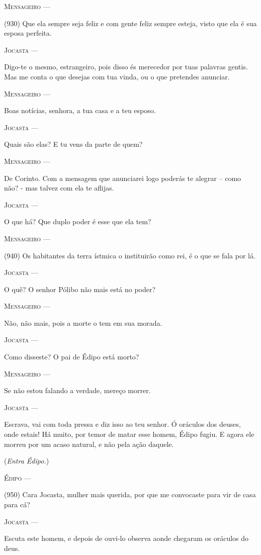 \textsc{Mensageiro} ---

(930) Que ela sempre seja feliz e com gente feliz sempre esteja, visto
que ela é sua esposa perfeita.

\textsc{Jocasta} ---

Digo-te o mesmo, estrangeiro, pois disso és merecedor por tuas palavras
gentis. Mas me conta o que desejas com tua vinda, ou o que pretendes
anunciar.

\textsc{Mensageiro} ---

Boas notícias, senhora, a tua casa e a teu esposo.

\textsc{Jocasta} ---

Quais são elas? E tu vens da parte de quem?

\textsc{Mensageiro} ---

De Corinto. Com a mensagem que anunciarei logo poderás te alegrar --
como não? - mas talvez com ela te aflijas.

\textsc{Jocasta} ---

O que há? Que duplo poder é esse que ela tem?

\textsc{Mensageiro} ---

(940) Os habitantes da terra ístmica o instituirão como rei, é o que se
fala por lá.

\textsc{Jocasta} ---

O quê? O senhor Pólibo não mais está no poder?

\textsc{Mensageiro} ---

Não, não mais, pois a morte o tem em sua morada.

\textsc{Jocasta} ---

Como disseste? O pai de Édipo está morto?

\textsc{Mensageiro} ---

Se não estou falando a verdade, mereço morrer.

\textsc{Jocasta} ---

Escrava, vai com toda pressa e diz isso ao teu senhor. Ó oráculos dos
deuses, onde estais! Há muito, por temor de matar esse homem, Édipo
fugiu. E agora ele morreu por um acaso natural, e não pela ação daquele.

(\emph{Entra Édipo.})

\textsc{Édipo} ---

(950) Cara Jocasta, mulher mais querida, por que me convocaste para vir
de casa para cá?

\textsc{Jocasta} ---

Escuta este homem, e depois de ouvi-lo observa aonde chegaram os
oráculos do deus.

